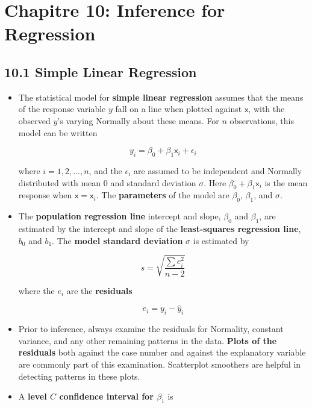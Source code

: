 \section{Chapitre 10: Inference for Regression}
	\subsection{10.1 Simple Linear Regression}
		\begin{itemize}
			\item The statistical model for \textbf{simple linear regression} assumes that the means of the response variable $y$ fall on a line when plotted against $\mathsf{x}$, with the observed $y$’s varying Normally about these means. For $n$ observations, this model can be written
		
			\[y_i=\beta_0+\beta_1 \mathsf{x}_i+\epsilon_i\]
			
			where $i = 1, 2,..., n$, and the $\epsilon_i$ are assumed to be independent and Normally distributed with mean $0$ and standard deviation $\sigma$. Here $\beta_0 + \beta_1 \mathsf{x}_i$ is the mean response when $\mathsf{x} = \mathsf{x}_i$. The \textbf{parameters} of the model are $\beta_0$, $\beta_1$, and $\sigma$.
			
			\item The \textbf{population regression line} intercept and slope, $\beta_0$ and $\beta_1$, are estimated by the intercept and slope of the \textbf{least-squares regression line}, $b_0$ and $b_1$. The \textbf{model standard deviation} $\sigma$ is estimated by
			
			\[s=\sqrt{\frac{\sum e_i^2}{n-2}}\]
			
			where the $e_i$ are the \textbf{residuals}
			
			\[e_i=y_i-\hat{y}_i\]
			
			\item Prior to inference, always examine the residuals for Normality, constant variance, and any other remaining patterns in the data. \textbf{Plots of the residuals} both against the case number and against the explanatory variable are commonly part of this examination. Scatterplot smoothers are helpful in detecting patterns in these plots.
			
			\item A \textbf{level $C$ confidence interval for $\beta_1$} is
			

\end{itemize}
